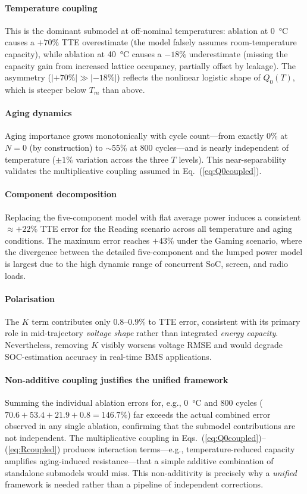 \documentclass[5p,times,number]{elsarticle}
\newcommand{\eqnref}[1]{\hyperref[#1]{\textup{Eq.~(\ref*{#1})}}}
\newcommand{\eqnsref}[2]{\hyperref[#1]{\textup{Eqs.~(\ref*{#1})}}--\hyperref[#2]{\textup{(\ref*{#2})}}}
\def\eqnref#1{Eq.~(\ref{#1})}
\def\eqnsref#1#2{Eqs.~(\ref{#1})--(\ref{#2})}
\begin{document}
\paragraph{Temperature coupling}
This is the dominant submodel at off-nominal temperatures: ablation at \SI{0}{\degreeCelsius} causes a $+70\%$ TTE overestimate (the model falsely assumes room-temperature capacity), while ablation at \SI{40}{\degreeCelsius} causes a $-18\%$ underestimate (missing the capacity gain from increased lattice occupancy, partially offset by leakage).
The asymmetry ($|+70\%| \gg |-18\%|$) reflects the nonlinear logistic shape of $Q_0(T)$, which is steeper below $T_m$ than above.

\paragraph{Aging dynamics}
Aging importance grows monotonically with cycle count---from exactly 0\% at $N=0$ (by construction) to $\sim$55\% at 800 cycles---and is nearly independent of temperature ($\pm 1\%$ variation across the three $T$ levels).
This near-separability validates the multiplicative coupling assumed in \eqnref{eq:Q0coupled}.

\paragraph{Component decomposition}
Replacing the five-component model with flat average power induces a consistent $\approx +22\%$ TTE error for the Reading scenario across all temperature and aging conditions.
The maximum error reaches $+43\%$ under the Gaming scenario, where the divergence between the detailed five-component and the lumped power model is largest due to the high dynamic range of concurrent SoC, screen, and radio loads.

\paragraph{Polarisation}
The $K$ term contributes only $0.8$--$0.9\%$ to TTE error, consistent with its primary role in mid-trajectory \emph{voltage shape} rather than integrated \emph{energy capacity}.
Nevertheless, removing $K$ visibly worsens voltage RMSE and would degrade SOC-estimation accuracy in real-time BMS applications.

\paragraph{Non-additive coupling justifies the unified framework}
Summing the individual ablation errors for, e.g., \SI{0}{\degreeCelsius} and 800 cycles ($70.6 + 53.4 + 21.9 + 0.8 = 146.7\%$) far exceeds the actual combined error observed in any single ablation, confirming that the submodel contributions are not independent.
The multiplicative coupling in \eqnsref{eq:Q0coupled}{eq:Rcoupled} produces interaction terms---e.g., temperature-reduced capacity amplifies aging-induced resistance---that a simple additive combination of standalone submodels would miss.
This non-additivity is precisely why a \emph{unified} framework is needed rather than a pipeline of independent corrections.
\end{document}
